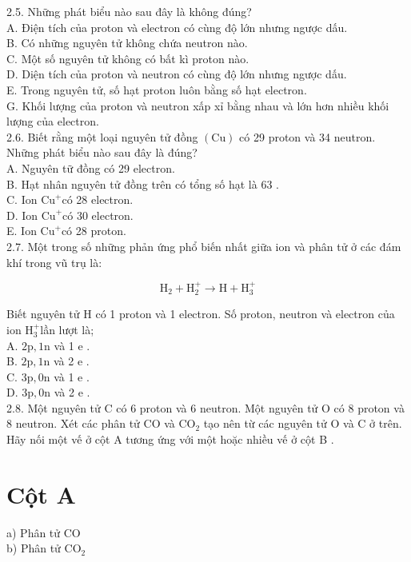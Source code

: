 \documentclass[10pt]{article}
\begin{document}
2.5. Những phát biểu nào sau đây là không đúng?\\
A. Điện tích của proton và electron có cùng độ lớn nhưng ngược dấu.\\
B. Có những nguyên tử không chứa neutron nào.\\
C. Một số nguyên tử không có bất kì proton nào.\\
D. Diện tích của proton và neutron có cùng độ lớn nhưng ngược dấu.\\
E. Trong nguyên tử, số hạt proton luôn bằng số hạt electron.\\
G. Khối lượng của proton và neutron xấp xỉ bằng nhau và lớn hơn nhiều khối lượng của electron.\\
2.6. Biết rằng một loại nguyên tử đồng $(\mathrm{Cu})$ có 29 proton và 34 neutron. Những phát biểu nào sau đây là đúng?\\
A. Nguyên tữ đồng có 29 electron.\\
B. Hạt nhân nguyên tử đồng trên có tổng số hạt là 63 .\\
C. Ion $\mathrm{Cu}^{+}$có 28 electron.\\
D. Ion $\mathrm{Cu}^{+}$có 30 electron.\\
E. Ion $\mathrm{Cu}^{+}$có 28 proton.\\
2.7. Một trong số những phản ứng phổ biến nhất giữa ion và phân tử ở các đám khí trong vũ trụ là:

$$
\mathrm{H}_{2}+\mathrm{H}_{2}^{+} \rightarrow \mathrm{H}+\mathrm{H}_{3}^{+}
$$

Biết nguyên tử H có 1 proton và 1 electron. Số proton, neutron và electron của ion $\mathrm{H}_{3}^{+}$lần lượt là;\\
A. $2 \mathrm{p}, 1 \mathrm{n}$ và 1 e .\\
B. $2 \mathrm{p}, 1 \mathrm{n}$ và 2 e .\\
C. $3 \mathrm{p}, 0 \mathrm{n}$ và 1 e .\\
D. $3 \mathrm{p}, 0 \mathrm{n}$ và 2 e .\\
2.8. Một nguyên tử C có 6 proton và 6 neutron. Một nguyên tử O có 8 proton và 8 neutron. Xét các phân tử CO và $\mathrm{CO}_{2}$ tạo nên từ các nguyên tử O và C ở trên. Hãy nối một vế ở cột A tương ứng với một hoặc nhiều vế ở cột B .

\section*{Cột A}
a) Phân tử CO\\
b) Phân tử $\mathrm{CO}_{2}$
\end{document}
